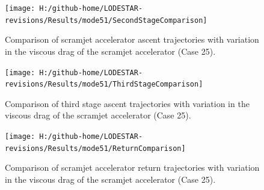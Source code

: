 \begin{figure}[!th]
\centering
\texttt{[image: H:/github-home/LODESTAR-revisions/Results/mode51/SecondStageComparison]}
\caption{Comparison of scramjet accelerator ascent trajectories with variation in the viscous drag of the scramjet accelerator (Case 25).}
\label{fig:SecondStageComparison-}
\end{figure}
\begin{figure}[!th]
\centering
\texttt{[image: H:/github-home/LODESTAR-revisions/Results/mode51/ThirdStageComparison]}
\caption{Comparison of third stage ascent trajectories with variation in the viscous drag of the scramjet accelerator (Case 25).}
\label{fig:ThirdStageComparison-}
\end{figure}
\begin{figure}[!th]
	\centering
	\texttt{[image: H:/github-home/LODESTAR-revisions/Results/mode51/ReturnComparison]}
	\caption{Comparison of scramjet accelerator return trajectories with variation in the viscous drag of the scramjet accelerator (Case 25).}
	\label{fig:ReturnComparison-}
\end{figure}
